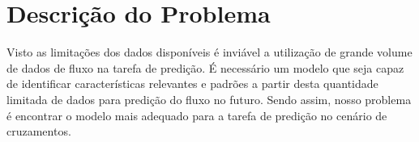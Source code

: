 \section{Descrição do Problema}


Visto as limitações dos dados disponíveis é inviável a utilização de grande volume de dados de fluxo na tarefa de predição. É necessário um modelo que seja capaz de identificar características relevantes e padrões a partir desta quantidade limitada de dados para predição do fluxo no futuro. Sendo assim, nosso problema é encontrar o modelo mais adequado para a tarefa de predição no cenário de cruzamentos.